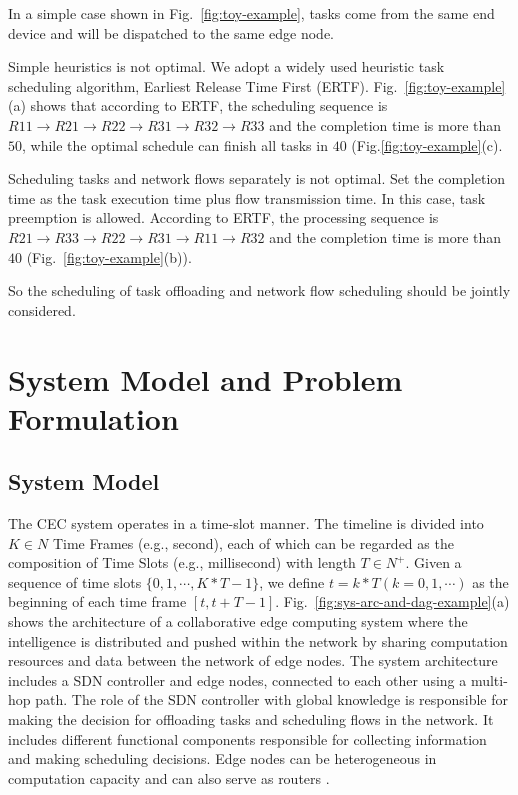 \documentclass[10pt, conference, letterpaper]{IEEEtran}
\begin{document}
In a simple case shown in Fig.~\ref{fig:toy-example}, tasks come from the same end device and will be dispatched to the same edge node.

Simple heuristics is not optimal. We adopt a widely used heuristic task scheduling algorithm, Earliest Release Time First (ERTF). Fig.~\ref{fig:toy-example}(a) shows that according to ERTF, the scheduling sequence is $R11 \rightarrow R21 \rightarrow R22 \rightarrow R31 \rightarrow R32 \rightarrow R33$ and the completion time is more than $50$, while the optimal schedule can finish all tasks in $40$ (Fig.\ref{fig:toy-example}(c). 

Scheduling tasks and network flows separately is not optimal. Set the completion time as the task execution time plus flow transmission time. In this case, task preemption is allowed. According to ERTF, the processing sequence is $R21 \rightarrow R33 \rightarrow R22 \rightarrow R31 \rightarrow R11 \rightarrow R32$ and the completion time is more than $40$ (Fig.~\ref{fig:toy-example}(b)).

So the scheduling of task offloading and network flow scheduling should be jointly considered.

\section{System Model and Problem Formulation}\label{sec:problem-definition}

\subsection{System Model}

The CEC system operates in a time-slot manner. The timeline is divided into $K \in N$ Time Frames (e.g., second), each of which can be regarded as the composition of Time Slots (e.g., millisecond) with length $T \in N^+$. Given a sequence of time slots $\{0, 1, \cdots , K*T-1\}$, we define $t = k*T (k = 0, 1, \cdots)$ as the beginning of each time frame $[t, t+T-1]$. Fig.~\ref{fig:sys-arc-and-dag-example}(a) shows the architecture of a collaborative edge computing system where the intelligence is distributed and pushed within the network by sharing computation resources and data between the network of edge nodes. The system architecture includes a SDN controller and edge nodes, connected to each other using a multi-hop path. The role of the SDN controller with global knowledge is responsible for making the decision for offloading tasks and scheduling flows in the network. It includes different functional components responsible for collecting information and making scheduling decisions. Edge nodes can be heterogeneous in computation capacity and can also serve as routers \cite{sahni2017edge}. 
\end{document}
